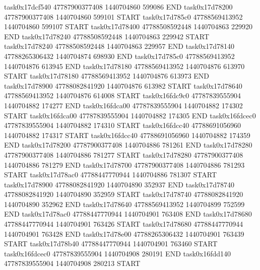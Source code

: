 task0x17dcf540 47787900377408          1440704860               599086  END
task0x17d78200 47787900377408          1440704860               599101  START
task0x17d785c0 47788569413952          1440704860               599107  START
task0x17d78400 47788508592448          1440704863               229920  END
task0x17d78240 47788508592448          1440704863               229942  START
task0x17d78240 47788508592448          1440704863               229957  END
task0x17d78140 47788265306432          1440704874               698930  END
task0x17d785c0 47788569413952          1440704876               613945  END
task0x17d78180 47788569413952          1440704876               613970  START
task0x17d78180 47788569413952          1440704876               613973  END
task0x17d78900 47788082841920          1440704876               613982  START
task0x17d78640 47788569413952          1440704876               614008  START
task0x16fdc9c0 47787839555904          1440704882               174277  END
task0x16fdca00 47787839555904          1440704882               174302  START
task0x16fdca00 47787839555904          1440704882               174305  END
task0x16fdcec0 47787839555904          1440704882               174310  START
task0x16fdcc40 47788691056960          1440704882               174317  START
task0x16fdcc40 47788691056960          1440704882               174359  END
task0x17d78200 47787900377408          1440704886               781261  END
task0x17d78280 47787900377408          1440704886               781277  START
task0x17d78280 47787900377408          1440704886               781279  END
task0x17d78700 47787900377408          1440704886               781293  START
task0x17d78ac0 47788447770944          1440704886               781307  START
task0x17d78900 47788082841920          1440704890               352937  END
task0x17d78740 47788082841920          1440704890               352959  START
task0x17d78740 47788082841920          1440704890               352962  END
task0x17d78640 47788569413952          1440704899               752599  END
task0x17d78ac0 47788447770944          1440704901               763408  END
task0x17d78680 47788447770944          1440704901               763426  START
task0x17d78680 47788447770944          1440704901               763428  END
task0x17d78e00 47788265306432          1440704901               763439  START
task0x17d78b40 47788447770944          1440704901               763460  START
task0x16fdcec0 47787839555904          1440704908               280191  END
task0x16fdd140 47787839555904          1440704908               280213  START

